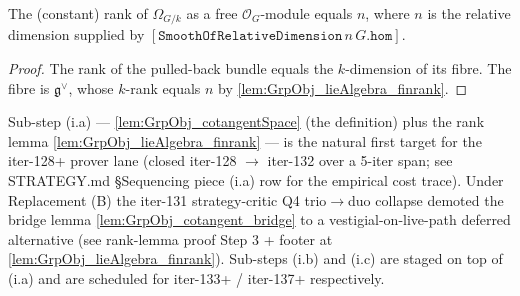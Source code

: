 \begin{lemma}
  \label{lem:GrpObj_omega_rank_eq_dim}
  
  \notready
  The (constant) rank of \(\Omega_{G/k}\) as a free \(\mathcal O_{G}\)-module equals \(n\), where \(n\) is the relative dimension supplied by \([\mathtt{SmoothOfRelativeDimension}\,n\,G.\mathtt{hom}]\).
\end{lemma}

\begin{proof}
  
  The rank of the pulled-back bundle equals the \(k\)-dimension of its fibre. The fibre is \(\mathfrak g^{\vee}\), whose \(k\)-rank equals \(n\) by \cref{lem:GrpObj_lieAlgebra_finrank}.
\end{proof}

\begin{remark}
  \label{rem:piece_i_first_target}
  
  Sub-step (i.a) --- \cref{lem:GrpObj_cotangentSpace} (the definition) plus the rank lemma \cref{lem:GrpObj_lieAlgebra_finrank} --- is the natural first target for the iter-128+ prover lane (closed iter-128 \(\to\) iter-132 over a 5-iter span; see STRATEGY.md \S Sequencing piece (i.a) row for the empirical cost trace). Under Replacement (B) the iter-131 strategy-critic Q4 trio\(\to\)duo collapse demoted the bridge lemma \cref{lem:GrpObj_cotangent_bridge} to a vestigial-on-live-path deferred alternative (see rank-lemma proof Step 3 + footer at \cref{lem:GrpObj_lieAlgebra_finrank}). Sub-steps (i.b) and (i.c) are staged on top of (i.a) and are scheduled for iter-133+ / iter-137+ respectively.
\end{remark}

